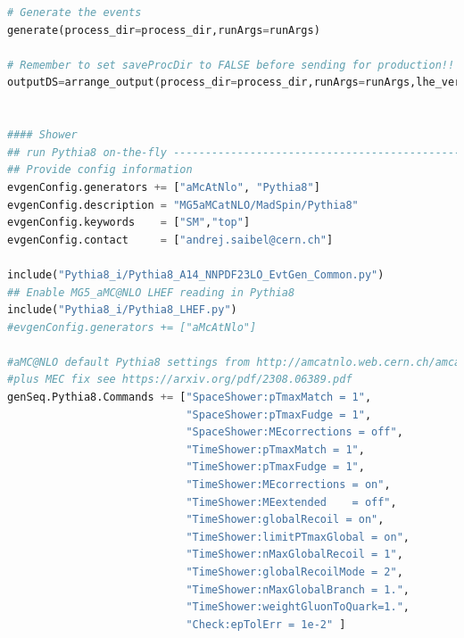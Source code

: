 \documentclass[NOTE, REPORT=true, atlasdraft=true, USenglish]{atlasdoc}
\begin{document}
\begin{lstlisting}[language=python, caption=$tW$ job option python script]
# Generate the events
generate(process_dir=process_dir,runArgs=runArgs)

# Remember to set saveProcDir to FALSE before sending for production!!
outputDS=arrange_output(process_dir=process_dir,runArgs=runArgs,lhe_version=3,saveProcDir=False)


#### Shower
## run Pythia8 on-the-fly -----------------------------------------------------
## Provide config information
evgenConfig.generators += ["aMcAtNlo", "Pythia8"]
evgenConfig.description = "MG5aMCatNLO/MadSpin/Pythia8"
evgenConfig.keywords    = ["SM","top"]
evgenConfig.contact     = ["andrej.saibel@cern.ch"]

include("Pythia8_i/Pythia8_A14_NNPDF23LO_EvtGen_Common.py")
## Enable MG5_aMC@NLO LHEF reading in Pythia8
include("Pythia8_i/Pythia8_LHEF.py")
#evgenConfig.generators += ["aMcAtNlo"]

#aMC@NLO default Pythia8 settings from http://amcatnlo.web.cern.ch/amcatnlo/list_detailed2.htm#showersettings
#plus MEC fix see https://arxiv.org/pdf/2308.06389.pdf
genSeq.Pythia8.Commands += ["SpaceShower:pTmaxMatch = 1",
                            "SpaceShower:pTmaxFudge = 1",
                            "SpaceShower:MEcorrections = off",
                            "TimeShower:pTmaxMatch = 1",
                            "TimeShower:pTmaxFudge = 1",
                            "TimeShower:MEcorrections = on",
                            "TimeShower:MEextended    = off",
                            "TimeShower:globalRecoil = on",
                            "TimeShower:limitPTmaxGlobal = on",
                            "TimeShower:nMaxGlobalRecoil = 1",
                            "TimeShower:globalRecoilMode = 2",
                            "TimeShower:nMaxGlobalBranch = 1.",
                            "TimeShower:weightGluonToQuark=1.",
                            "Check:epTolErr = 1e-2" ]
\end{lstlisting}

\clearpage
\end{document}
